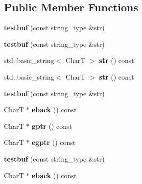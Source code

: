 \subsection*{Public Member Functions}
\begin{DoxyCompactItemize}
\item 
\mbox{\label{structtestbuf_af4500052e14c24781929e2e23a03b7f4}} 
{\bfseries testbuf} (const string\+\_\+type \&str)
\item 
\mbox{\label{structtestbuf_af4500052e14c24781929e2e23a03b7f4}} 
{\bfseries testbuf} (const string\+\_\+type \&str)
\item 
\mbox{\label{structtestbuf_a077afc7549a2a7a21f840ba884695eab}} 
std\+::basic\+\_\+string$<$ CharT $>$ {\bfseries str} () const
\item 
\mbox{\label{structtestbuf_a077afc7549a2a7a21f840ba884695eab}} 
std\+::basic\+\_\+string$<$ CharT $>$ {\bfseries str} () const
\item 
\mbox{\label{structtestbuf_af4500052e14c24781929e2e23a03b7f4}} 
{\bfseries testbuf} (const string\+\_\+type \&str)
\item 
\mbox{\label{structtestbuf_a1f4df16dc86bc40a9af64b5fff87cef0}} 
CharT $\ast$ {\bfseries eback} () const
\item 
\mbox{\label{structtestbuf_a30875f59e62daf2cf38ec0cd7e79ee68}} 
CharT $\ast$ {\bfseries gptr} () const
\item 
\mbox{\label{structtestbuf_a3aaa639283f34387537715800c38e416}} 
CharT $\ast$ {\bfseries egptr} () const
\item 
\mbox{\label{structtestbuf_af4500052e14c24781929e2e23a03b7f4}} 
{\bfseries testbuf} (const string\+\_\+type \&str)
\item 
\mbox{\label{structtestbuf_a1f4df16dc86bc40a9af64b5fff87cef0}} 
CharT $\ast$ {\bfseries eback} () const
\item 
\mbox{\label{structtestbuf_a30875f59e62daf2cf38ec0cd7e79ee68}} 

\end{DoxyCompactItemize}
